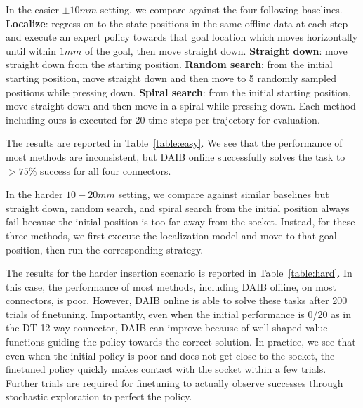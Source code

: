 In the easier $\pm10mm$ setting, we compare against the four following baselines. \textbf{Localize}: regress on to the state positions in the same offline data at each step and execute an expert policy towards that goal location which moves horizontally until within $1mm$ of the goal, then move straight down. \textbf{Straight down}: move straight down from the starting position. \textbf{Random search}: from the initial starting position, move straight down and then move to 5 randomly sampled positions while pressing down. \textbf{Spiral search}: from the initial starting position, move straight down and then move in a spiral while pressing down. Each method including ours is executed for 20 time steps per trajectory for evaluation.

The results are reported in Table~\ref{table:easy}. We see that the performance of most methods are inconsistent, but DAIB online successfully solves the task to $>75\%$ success for all four connectors.

In the harder $10-20mm$ setting, we compare against similar baselines but straight down, random search, and spiral search from the initial position always fail because the initial position is too far away from the socket. Instead, for these three methods, we first execute the localization model and move to that goal position, then run the corresponding strategy.

The results for the harder insertion scenario is reported in Table~\ref{table:hard}. In this case, the performance of most methods, including DAIB offline, on most connectors, is poor. However, DAIB online is able to solve these tasks after 200 trials of finetuning. Importantly, even when the initial performance is 0/20 as in the DT 12-way connector, DAIB can improve because of well-shaped value functions guiding the policy towards the correct solution. In practice, we see that even when the initial policy is poor and does not get close to the socket, the finetuned policy quickly makes contact with the socket within a few trials. Further trials are required for finetuning to actually observe successes through stochastic exploration to perfect the policy.




